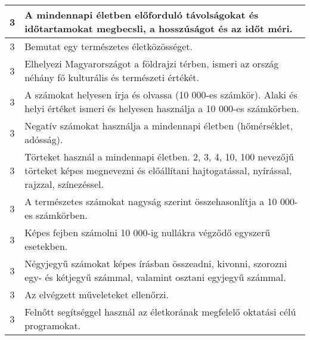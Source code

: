 \begin{longtable}{c | p{12cm} }
                                
                                          3 &  A mindennapi életben előforduló távolságokat és időtartamokat megbecsli, a hosszúságot és az időt méri. \\ \hline
                                          3 &  Bemutat egy természetes életközösséget. \\ \hline
                                          3 &  Elhelyezi Magyarországot a földrajzi térben, ismeri az ország néhány fő kulturális és természeti értékét. \\ \hline
                                          3 &  A számokat helyesen írja és olvassa (10 000-es számkör). Alaki és helyi értéket ismeri és helyesen használja a 10 000-es számkörben. \\ \hline
                                          3 &  Negatív számokat használja a mindennapi életben (hőmérséklet, adósság). \\ \hline
                                          3 &  Törteket használ a mindennapi életben. 2, 3, 4, 10, 100 nevezőjű törteket képes megnevezni és előállítani hajtogatással, nyírással, rajzzal, színezéssel. \\ \hline
                                          3 &  A természetes számokat nagyság szerint összehasonlítja a 10 000-es számkörben. \\ \hline
                                          3 &  Képes fejben számolni 10 000-ig nullákra végződő egyszerű esetekben. \\ \hline
                                          3 &  Négyjegyű számokat képes írásban összeadni, kivonni, szorozni egy- és kétjegyű számmal, valamint osztani egyjegyű számmal. \\ \hline
                                          3 &  Az elvégzett műveleteket ellenőrzi. \\ \hline
                                          3 &  Felnőtt segítséggel használ az életkorának megfelelő oktatási célú programokat. \\ \hline
                                      

\end{longtable}
